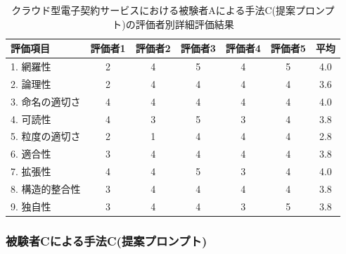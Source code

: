 \begin{table}[tp]
  \caption{クラウド型電子契約サービスにおける被験者Aによる手法C(提案プロンプト)の評価者別詳細評価結果}
  \label{tb:cloud_detailed_evaluation_results_C}
  \centering
  \begin{tabular}{|l|c|c|c|c|c|c|}
    \hline
    \textbf{評価項目} & \textbf{評価者1} & \textbf{評価者2} & \textbf{評価者3} & \textbf{評価者4} & \textbf{評価者5} & \textbf{平均} \\
    \hline\hline
    1. 網羅性 & 2 & 4 & 5 & 4 & 5 & 4.0 \\
    \hline
    2. 論理性 & 2 & 4 & 4 & 4 & 4 & 3.6 \\
    \hline
    3. 命名の適切さ & 4 & 4 & 4 & 4 & 4 & 4.0 \\
    \hline
    4. 可読性 & 4 & 3 & 5 & 3 & 4 & 3.8 \\
    \hline
    5. 粒度の適切さ & 2 & 1 & 4 & 4 & 4 & 2.8 \\
    \hline
    6. 適合性 & 3 & 4 & 4 & 4 & 4 & 3.8 \\
    \hline
    7. 拡張性 & 4 & 4 & 5 & 3 & 4 & 4.0 \\
    \hline
    8. 構造的整合性 & 3 & 4 & 4 & 4 & 4 & 3.8 \\
    \hline
    9. 独自性 & 3 & 4 & 4 & 3 & 5 & 3.8 \\
    \hline
  \end{tabular}
\end{table}





\subsubsection{被験者Cによる手法C(提案プロンプト)}

